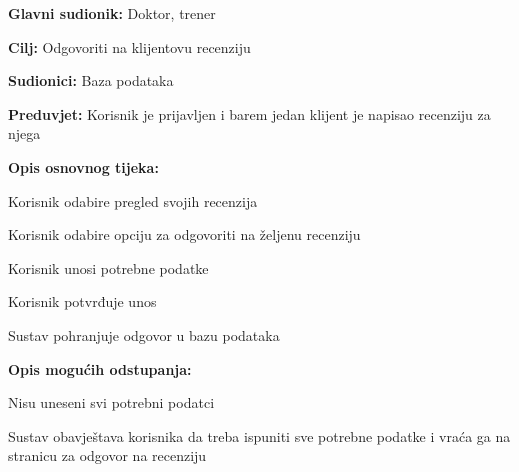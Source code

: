 					\noindent {}
					\begin{packed_item}
						
						\item \textbf{Glavni sudionik:} Doktor, trener
						\item  \textbf{Cilj:} Odgovoriti na klijentovu recenziju
						\item  \textbf{Sudionici:} Baza podataka
						\item  \textbf{Preduvjet:} Korisnik je prijavljen i barem jedan klijent je napisao recenziju za njega
						\item  \textbf{Opis osnovnog tijeka:}
						
						\item[] \begin{packed_enum}
							
							\item Korisnik odabire pregled svojih recenzija
							\item Korisnik odabire opciju za odgovoriti na željenu recenziju
							\item Korisnik unosi potrebne podatke
							\item Korisnik potvrđuje unos
							\item Sustav pohranjuje odgovor u bazu podataka
							
						\end{packed_enum}
					
						\item  \textbf{Opis mogućih odstupanja:}
						
						\item[] \begin{packed_item}
							
							\item[4.a] Nisu uneseni svi potrebni podatci
							\item[] \begin{packed_enum}
								
								\item Sustav obavještava korisnika da treba ispuniti sve potrebne podatke i vraća ga na stranicu za odgovor na recenziju
								
							\end{packed_enum}
							
						\end{packed_item}
						
					\end{packed_item}
				
